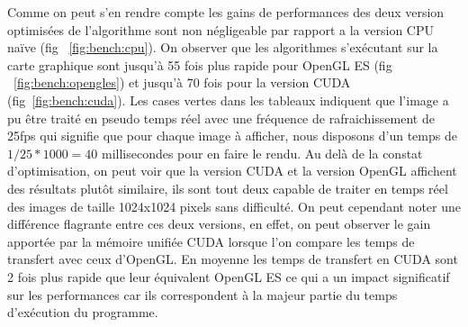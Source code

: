 \begin{table}[H]
\centering
\caption{CPU - Convolution d'une image en niveau de gris par un filtre de taille 5x5 - float 32bits}
\label{fig:bench:cpu}
\end{table}

Comme on peut s'en rendre compte les gains de performances des deux version optimisées de l'algorithme sont non négligeable par rapport a la version CPU naïve (fig ~\ref{fig:bench:cpu}). On observer que les algorithmes s'exécutant sur la carte graphique sont jusqu'à 55 fois plus rapide pour OpenGL ES (fig ~\ref{fig:bench:opengles}) et jusqu'à 70 fois pour la version CUDA (fig~\ref{fig:bench:cuda}). Les cases vertes dans les tableaux indiquent que l'image a pu être traité en pseudo temps réel avec une fréquence de rafraichissement de 25fps qui signifie que pour chaque image à afficher, nous disposons d'un temps de $1/25 * 1000 = 40$ millisecondes pour en faire le rendu.
Au delà de la constat d'optimisation, on peut voir que la version CUDA et la version OpenGL affichent des résultats plutôt similaire, ils sont tout deux capable de traiter en temps réel des images de taille 1024x1024 pixels sans difficulté. On peut cependant noter une différence flagrante entre ces deux versions, en effet, on peut observer le gain apportée par la mémoire unifiée CUDA lorsque l'on compare les temps de transfert avec ceux d'OpenGL. En moyenne les temps de transfert en CUDA sont 2 fois plus rapide que leur équivalent OpenGL ES ce qui a un impact significatif sur les performances car ils correspondent à la majeur partie du temps d'exécution du programme.

